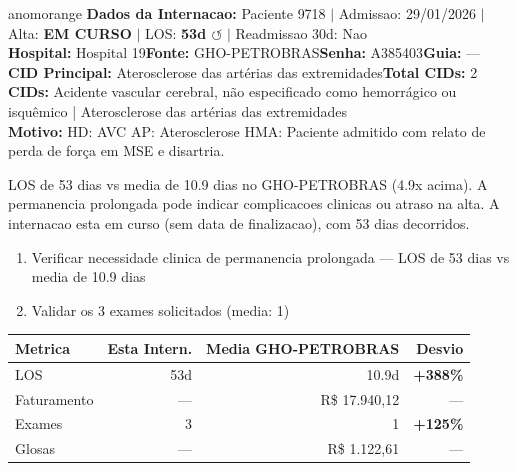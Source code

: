 \documentclass[a4paper,10pt]{article}
\begin{document}
\begin{anomalycard}[Internacao 163882 | GHO-PETROBRAS | ALTO (z=4.85)]{anomorange}
\textbf{Dados da Internacao:} Paciente 9718 $\mid$ Admissao: 29/01/2026 $\mid$ Alta: \textcolor{anomorange}{\textbf{EM CURSO}} $\mid$ LOS: \textbf{53d \textcolor{anomorange}{$\circlearrowleft$}} $\mid$ Readmissao 30d: Nao\\
\textbf{Hospital:} Hospital 19\quad\textbf{Fonte:} GHO-PETROBRAS\quad\textbf{Senha:} A385403\quad\textbf{Guia:} ---\\
\textbf{CID Principal:} {\small Aterosclerose das artérias das extremidades}\quad\textbf{Total CIDs:} 2\\

\textbf{CIDs:} {\scriptsize Acidente vascular cerebral, não especificado como hemorrágico ou isquêmico | Aterosclerose das artérias das extremidades}\\

\textbf{Motivo:} {\scriptsize HD: AVC AP: Aterosclerose HMA: Paciente admitido com relato de perda de força em MSE e disartria.}\\

\vspace{2pt}\begin{tcolorbox}[colback=severityred!20,colframe=anomorange,title={\textbf{Interpretacao de Negocio}},fonttitle=\bfseries\small,left=4pt,right=4pt,top=3pt,bottom=3pt]
{\small LOS de 53 dias vs media de 10.9 dias no GHO-PETROBRAS (4.9x acima). A permanencia prolongada pode indicar complicacoes clinicas ou atraso na alta. A internacao esta em curso (sem data de finalizacao), com 53 dias decorridos.}
\end{tcolorbox}
\begin{tcolorbox}[colback=severityyellow!30,colframe=anomorange,title={\textbf{Recomendacoes Especificas}},fonttitle=\bfseries\small,left=4pt,right=4pt,top=3pt,bottom=3pt]
\begin{enumerate}[nosep,leftmargin=16pt]
\item {\small Verificar necessidade clinica de permanencia prolongada --- LOS de 53 dias vs media de 10.9 dias}
\item {\small Validar os 3 exames solicitados (media: 1)}
\end{enumerate}
\end{tcolorbox}
\begin{center}\begin{tabular}{l r r r}\toprule\textbf{Metrica} & \textbf{Esta Intern.} & \textbf{Media GHO-PETROBRAS} & \textbf{Desvio} \\\midrule
LOS & 53d & 10.9d & \textcolor{anomred}{\textbf{+388\%}} \\
Faturamento & --- & R\$ 17.940,12 & --- \\
Exames & 3 & 1 & \textcolor{anomred}{\textbf{+125\%}} \\
Glosas & --- & R\$ 1.122,61 & --- \\
\bottomrule\end{tabular}\end{center}


\end{anomalycard}
\end{document}
